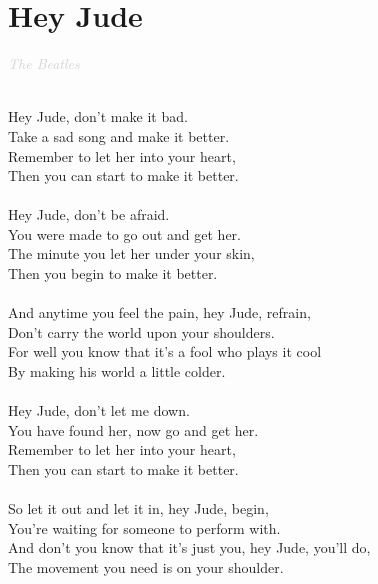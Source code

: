\documentclass[a5paper, 10pt]{book}
\begin{document}
\section{Hey Jude}\textcolor{lightgray}{\textit{The Beatles}}\\~\\
\begin{minipage}[t]{0.8\textwidth}
  Hey Jude, don't make it bad.\\
  Take a sad song and make it better.\\
  Remember to let her into your heart,\\
  Then you can start to make it better.\\
  \\
  Hey Jude, don't be afraid.\\
  You were made to go out and get her.\\
  The minute you let her under your skin,\\
  Then you begin to make it better.\\
  \\
  \hspace*{4mm}And anytime you feel the pain, hey Jude, refrain,\\
  \hspace*{4mm}Don't carry the world upon your shoulders.\\
  \hspace*{4mm}For well you know that it's a fool who plays it cool\\
  \hspace*{4mm}By making his world a little colder.\\
  \\
  Hey Jude, don't let me down.\\
  You have found her, now go and get her.\\
  Remember to let her into your heart,\\
  Then you can start to make it better.\\
  \\
  \hspace*{4mm}So let it out and let it in, hey Jude, begin,\\
  \hspace*{4mm}You're waiting for someone to perform with.\\
  \hspace*{4mm}And don't you know that it's just you, hey Jude, you'll do,\\
  \hspace*{4mm}The movement you need is on your shoulder.\\

\end{minipage}
\end{document}
